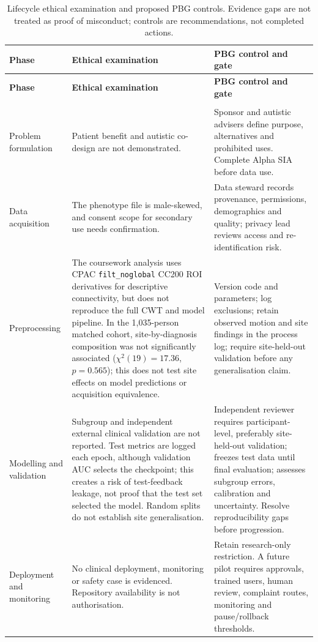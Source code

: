 \documentclass[11pt,a4paper]{article}
\begin{document}
\small
\setlength{\LTcapwidth}{\textwidth}
\setlength{\tabcolsep}{3pt}
\begin{longtable}{>{\raggedright\arraybackslash}p{1.9cm} >{\raggedright\arraybackslash}p{6.3cm} >{\raggedright\arraybackslash}p{6.3cm}}
\caption{Lifecycle ethical examination and proposed PBG controls. Evidence gaps are not treated as proof of misconduct; controls are recommendations, not completed actions.}
\label{tab:lifecycle}\\
\toprule
\textbf{Phase} & \textbf{Ethical examination} & \textbf{PBG control and gate} \\
\midrule
\endfirsthead
\toprule
\textbf{Phase} & \textbf{Ethical examination} & \textbf{PBG control and gate} \\
\midrule
\endhead
\midrule
\multicolumn{3}{r}{\small\itshape Continued on next page}\\
\endfoot
\bottomrule
\endlastfoot
Problem formulation & Patient benefit and autistic co-design are not demonstrated. & Sponsor and autistic advisers define purpose, alternatives and prohibited uses. Complete Alpha SIA before data use.\\
Data acquisition & The phenotype file is male-skewed, and consent scope for secondary use needs confirmation. & Data steward records provenance, permissions, demographics and quality; privacy lead reviews access and re-identification risk.\\
Preprocessing & The coursework analysis uses CPAC \texttt{filt\_noglobal} CC200 ROI derivatives for descriptive connectivity, but does not reproduce the full CWT and model pipeline. In the 1,035-person matched cohort, site-by-diagnosis composition was not significantly associated ($\chi^2(19)=17.36$, $p=0.565$); this does not test site effects on model predictions or acquisition equivalence. & Version code and parameters; log exclusions; retain observed motion and site findings in the process log; require site-held-out validation before any generalisation claim. \\
Modelling and validation & Subgroup and independent external clinical validation are not reported. Test metrics are logged each epoch, although validation AUC selects the checkpoint; this creates a risk of test-feedback leakage, not proof that the test set selected the model. Random splits do not establish site generalisation. & Independent reviewer requires participant-level, preferably site-held-out validation; freezes test data until final evaluation; assesses subgroup errors, calibration and uncertainty. Resolve reproducibility gaps before progression.\\
Deployment and monitoring & No clinical deployment, monitoring or safety case is evidenced. Repository availability is not authorisation. & Retain research-only restriction. A future pilot requires approvals, trained users, human review, complaint routes, monitoring and pause/rollback thresholds.\\
\end{longtable}
\normalsize
\end{document}
